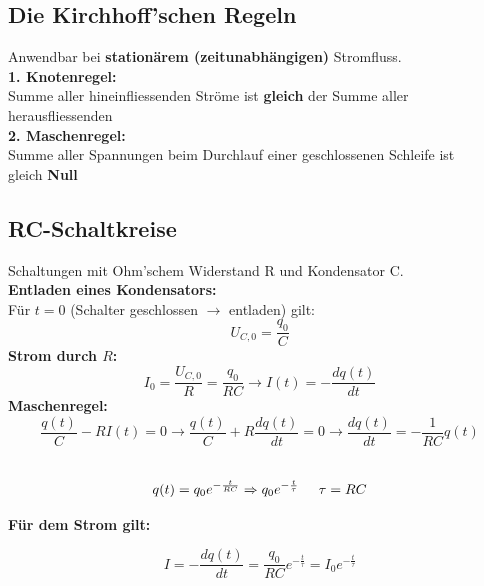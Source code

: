 \subsection{Die Kirchhoff'schen Regeln}
Anwendbar bei \textbf{stationärem (zeitunabhängigen)} Stromfluss. \\[1ex]
\hspace{5mm} \textbf{1. Knotenregel:} \\
\hspace{10mm} Summe aller hineinfliessenden Ströme ist \textbf{gleich} der Summe aller \\ \hspace{10mm} herausfliessenden
\\[2ex]
\hspace{5mm} \textbf{2. Maschenregel:} \\
\hspace{10mm} Summe aller Spannungen beim Durchlauf einer geschlossenen Schleife ist \\ \hspace{10mm} gleich \textbf{Null}
\\[2ex]

\subsection{RC-Schaltkreise}
Schaltungen mit Ohm'schem Widerstand R und Kondensator C. \\[2ex]

\textbf{Entladen eines Kondensators:} \\
Für $t = 0$ (Schalter geschlossen $\rightarrow$ entladen) gilt:
\[
    U_{C,0} = \frac{q_0}{C} 
\]
\hspace{5mm} \textbf{Strom durch $R$:}
\[
    I_0 = \frac{U_{C,0}}{R} =\frac{q_0}{RC} \rightarrow  I(t) = -\frac{dq(t)}{dt}
\]
\hspace{5mm} \textbf{Maschenregel:}
\[
    \frac{q(t)}{C} - RI(t) = 0 \rightarrow \frac{q(t)}{C} + R\frac{dq(t)}{dt} = 0 \rightarrow \frac{dq(t)}{dt} = - \frac{1}{RC}q(t)
\]
\\[1ex]
\begin{formulabox}
    \[
        q(t) = q_0 e^{-\frac{t}{RC}} \Rightarrow q_0 e^{-\frac{t}{\tau}} \hspace{5mm} \tau = RC
    \]
\end{formulabox}
\hspace{5mm} \textbf{Für dem Strom gilt:}
\begin{formulabox}
    \[
        I = -\frac{dq(t)}{dt} = \frac{q_0}{RC}e^{-\frac{t}{\tau}} = I_0 e^{-\frac{t}{\tau}}
    \]
\end{formulabox}


